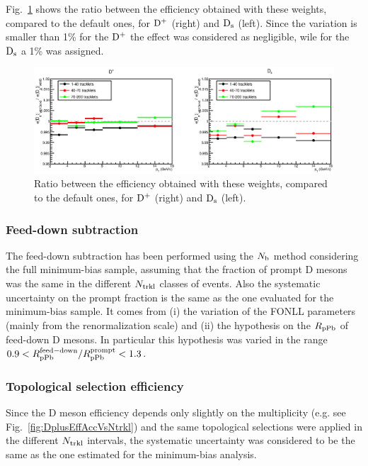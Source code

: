 Fig.~\ref{fig:DsDplusVsMult_SystEffWeights} shows the ratio between the efficiency obtained with these weights, compared to the default ones, for ${\rm D^+}$ (right) and ${\rm D_s}$ (left). Since the variation is smaller than 1\% for the ${\rm D^+}$ the effect was considered as negligible, wile for the ${\rm D_s}$ a 1\% was assigned.

\begin{figure}[htpb]
\centering
 \includegraphics[width=.9\textwidth]{FigCap6/SystOnDWeightsWithCandVsWithD.eps}
 \caption{Ratio between the efficiency obtained with these weights, compared to the default ones, for ${\rm D^+}$ (right) and ${\rm D_s}$ (left).}
 \label{fig:DsDplusVsMult_SystEffWeights}
\end{figure}

\subsubsection{Feed-down subtraction}
The feed-down subtraction has been performed using the $N_{\rm b}$ method considering the full minimum-bias sample, assuming that the fraction of prompt D mesons was the same in the different $N_{\rm trkl}$ classes of events. Also the systematic uncertainty on the prompt fraction is the same as the one evaluated for the minimum-bias sample. It comes from (i) the variation of the FONLL parameters (mainly from the renormalization scale) and (ii) the hypothesis on the $R_{\rm pPb}$ of feed-down D mesons. In particular this hypothesis was varied in the range $0.9 <R_{\rm pPb}^{\rm feed-down}/R_{\rm pPb}^{\rm prompt} < 1.3$.

\subsubsection{Topological selection efficiency}
Since the D meson efficiency depends only slightly on the multiplicity (e.g. see Fig.~\ref{fig:DplusEffAccVsNtrkl}) and the same topological selections were applied in the different $N_{\rm trkl}$ intervals, the systematic uncertainty was considered to be the same as the one estimated for the minimum-bias analysis.


